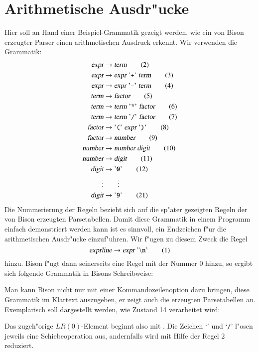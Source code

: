 \section{Arithmetische Ausdr"ucke}
Hier soll an Hand einer Beispiel-Grammatik gezeigt werden, wie ein 
von Bison erzeugter Parser einen arithmetischen Ausdruck
erkennt. Wir verwenden die Grammatik:
\begin{align}
\textsl{expr}&\rightarrow \textsl{term}\tag{2}\\
\textsl{expr}&\rightarrow \textsl{expr}\;\text{'{\tt +}'}\;\textsl{term}\tag{3}\\
\textsl{expr}&\rightarrow \textsl{expr}\;\text{'{\tt -}'}\;\textsl{term}\tag{4}\\
\textsl{term}&\rightarrow \textsl{factor}\tag{5}\\
\textsl{term}&\rightarrow \textsl{term}\;\text{'{\tt *}'}\;\textsl{factor}\tag{6}\\
\textsl{term}&\rightarrow \textsl{term}\;\text{'{\tt /}'}\;\textsl{factor}\tag{7}\\
\textsl{factor}&\rightarrow\text{'{\tt (}'}\;\textsl{expr}\;\text{'{\tt )}'}\tag{8}\\
\textsl{factor}&\rightarrow\textsl{number}\tag{9}\\
\textsl{number}&\rightarrow\textsl{number}\;\textsl{digit}\tag{10}\\
\textsl{number}&\rightarrow\textsl{digit}\tag{11}\\
\textsl{digit}&\rightarrow\text{'{\tt 0}'}\tag{12}\\
\vdots&\qquad\vdots\notag\\
\textsl{digit}&\rightarrow\text{'{\tt 9}'}\tag{21}
\end{align}
Die Nummerierung der Regeln bezieht sich auf die sp"ater gezeigten Regeln
der von Bison erzeugten Parsetabellen. Damit diese Grammatik in einem
Programm einfach demonstriert werden kann ist es sinnvoll, ein Endzeichen
f"ur die arithmetischen Ausdr"ucke einzuf"uhren. Wir f"ugen zu diesem
Zweck die Regel 
\begin{equation}
\textsl{exprline}\rightarrow \textsl{expr}\;\text{'{\tt $\setminus$n}'}
\tag{1}
\end{equation}
hinzu. Bison f"ugt dann seinerseits eine Regel mit der Nummer 0 hinzu, so ergibt
sich folgende Grammatik in Bisons Schreibweise:

Man kann Bison nicht nur mit einer Kommandozeilenoption dazu bringen, diese
Grammatik im Klartext auszugeben, er zeigt auch die erzeugten Parsetabellen
an. Exemplarisch soll dargestellt werden, wie Zustand 14 verarbeitet
wird:

Das zugeh"orige $LR(0)$-Element beginnt also mit . Die Zeichen
`{\tt *}' und `{\tt /}' l"osen jeweils eine Schiebeoperation aus, andernfalls
wird mit Hilfe der Regel 2 reduziert.

